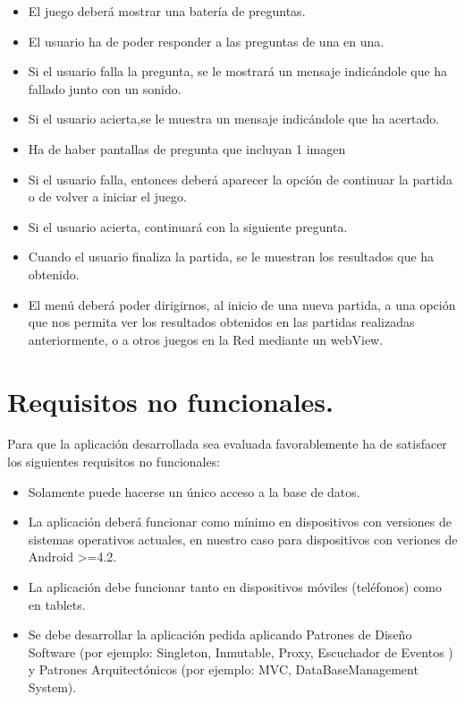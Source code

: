 \documentclass[10pt]{article}
\begin{document}
\begin{itemize}
	\item El juego deberá mostrar una batería de preguntas.
	\item El usuario ha de poder responder a las preguntas de una en una.
	\item Si el usuario falla la pregunta, se le mostrará un mensaje indicándole que ha fallado junto con un sonido.
	\item Si el usuario acierta,se le muestra un mensaje indicándole que ha acertado.
	\item Ha de haber pantallas de pregunta que incluyan 1 imagen
	\item Si el usuario falla, entonces deberá aparecer la opción de continuar la partida o de volver a iniciar el juego.
	\item Si el usuario acierta, continuará con la siguiente pregunta.
	\item Cuando el usuario finaliza la partida, se le muestran los resultados que ha obtenido. 
	\item El menú deberá poder dirigirnos, al inicio de una nueva partida, a una opción que nos permita ver los resultados obtenidos en las partidas realizadas anteriormente, o a otros juegos en la Red mediante un webView.

\end{itemize}


\section{Requisitos no funcionales.}

Para que la aplicación desarrollada sea evaluada favorablemente ha de satisfacer los siguientes requisitos no funcionales:\\

\begin{itemize}
	\item Solamente puede hacerse un único acceso a la base de datos.
	\item La aplicación deberá funcionar como mínimo en dispositivos con versiones de sistemas
operativos actuales, en nuestro caso para dispositivos con veriones  de Android >=4.2.
	\item La aplicación debe funcionar tanto en dispositivos móviles (teléfonos) como en tablets.
	\item Se debe desarrollar la aplicación pedida aplicando Patrones de Diseño Software (por ejemplo: Singleton, Inmutable, Proxy, Escuchador de Eventos ) y Patrones Arquitectónicos (por ejemplo: MVC, DataBaseManagement System).

\end{itemize}
\end{document}

